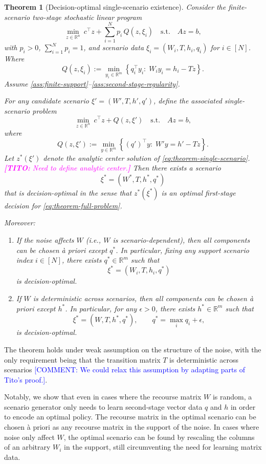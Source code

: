 \documentclass{article}
\newcommand{\R}{\mathbb{R}}
\newcommand{\thc}[1]{\textcolor{magenta}{\textbf{[TITO:} #1\textbf{]}}}
\theoremstyle{plain}
\newtheorem{theorem}{Theorem}
\theoremstyle{definition}
\theoremstyle{remark}
\begin{document}
\begin{theorem}[Decision-optimal single-scenario existence]
\label{thm:decision-optimal-scenario}
Consider the finite-scenario two-stage stochastic linear program
\begin{equation}
\label{eq:theorem-full-problem}
\min_{z\in\R^n}\ c^\top z+\sum_{i=1}^{N}p_i\,Q(z,\xi_i)
\quad\text{s.t.}\quad Az=b,
\end{equation}
with $p_i>0$, $\sum_{i=1}^N p_i=1$, and scenario data $\xi_i=(W_i,T,h_i,q_i)$ for $i\in[N]$.
Where
\[
Q(z,\xi_i):=\min_{y_i\in\R^m}\left\{q_i^\top y_i:\;W_i y_i=h_i-Tz\right\}.
\]
Assume \ref{ass:finite-support}--\ref{ass:second-stage-regularity}.  

For any candidate scenario $\xi'=(W',T,h',q')$, define the associated single-scenario problem
\begin{equation}
\label{eq:theorem-single-scenario}
\min_{z\in\R^n}\ c^\top z+Q(z,\xi')
\quad\text{s.t.}\quad Az=b,
\end{equation}
where
\[
Q(z,\xi'):=\min_{y\in\R^m}\left\{(q')^\top y:\;W' y=h'-Tz\right\}.
\]
Let $z^*(\xi')$ denote the analytic center solution of \eqref{eq:theorem-single-scenario}. \thc{Need to define analytic center.} Then there exists a scenario
\[
\xi^*=(W^*,T,h^*,q^*)
\]
that is decision-optimal in the sense that $z^*(\xi^*)$ is an optimal first-stage decision for \eqref{eq:theorem-full-problem}.

Moreover:
\begin{enumerate}
\item If the noise affects $W$ (i.e., $W$ is scenario-dependent), then all components can be chosen \`a priori except $q^*$. In particular, fixing any support scenario index $i\in[N]$, there exists $q^*\in\R^m$ such that
\[
\xi^*=(W_i,T,h_i,q^*)
\]
is decision-optimal.
\item If $W$ is deterministic across scenarios, then all components can be chosen \`a priori except $h^*$. In particular, for any $\epsilon>0$, there exists $h^*\in\R^m$ such that
\[
\xi^*=(W,T,h^*,q^*),\qquad q^*=\max_i q_i+\epsilon,
\]
is decision-optimal.
\end{enumerate}
\end{theorem}

The theorem holds under weak assumption on the structure of the noise, with the only requirement being that the transition matrix $T$ is deterministic across scenarios \textcolor{blue}{[COMMENT: We could relax this assumption by adapting parts of Tito’s proof.]}.

Notably, we show that even in cases where the recourse matrix $W$ is random, a scenario generator only needs to learn second-stage vector data $q$ and $h$ in order to encode an optimal policy. The recourse matrix in the optimal scenario can be chosen \`a priori as any recourse matrix in the support of the noise. In cases where noise only affect $W$, the optimal scenario can be found by rescaling the columns of an arbitrary $W_i$ in the support, still circumventing the need for learning matrix data.
\end{document}
